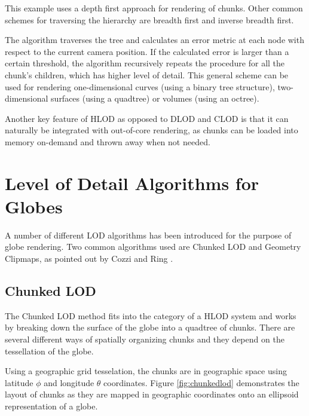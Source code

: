 This example uses a depth first approach for rendering of chunks. Other common schemes for traversing the hierarchy are breadth first and inverse breadth first.

The algorithm traverses the tree and calculates an error metric at each node with respect to the current camera position. If the calculated error is larger than a certain threshold, the algorithm recursively repeats the procedure for all the chunk's children, which has higher level of detail. This general scheme can be used for rendering one-dimensional curves (using a binary tree structure), two-dimensional surfaces (using a quadtree) or volumes (using an octree).

Another key feature of HLOD as opposed to DLOD and CLOD is that it can naturally be integrated with out-of-core rendering, as chunks can be loaded into memory on-demand and thrown away when not needed.



\section{Level of Detail Algorithms for Globes}
A number of different LOD algorithms has been introduced for the purpose of globe rendering. Two common algorithms used are Chunked LOD and Geometry Clipmaps, as pointed out by Cozzi and Ring \cite{cozzi11}.

\subsection{Chunked LOD}
\label{section:chunkedlodbacground}
The Chunked LOD method fits into the category of a HLOD system and works by breaking down the surface of the globe into a quadtree of chunks. There are several different ways of spatially organizing chunks and they depend on the tessellation of the globe. 

Using a geographic grid tesselation, the chunks are in geographic space using latitude $\phi$ and longitude $\theta$ coordinates. Figure \ref{fig:chunkedlod} demonstrates the layout of chunks as they are mapped in geographic coordinates onto an ellipsoid representation of a globe.

